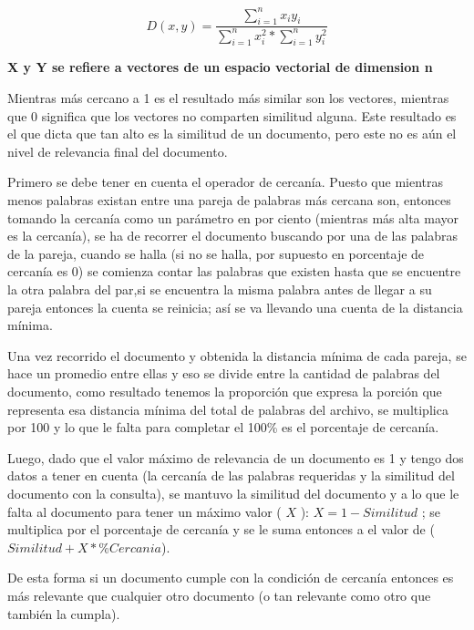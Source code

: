 \documentclass[10pt]{article}
\begin{document}
\huge \begin{equation*}
	D(x,y) = \frac{\sum_{i=1}^{n} x_{i} y_{i} }{ \sum_{i=1}^{n} x_{i}^2 * \sum_{i=1}^{n} y_{i}^2 }
\end{equation*} \normalsize

\begin{center}
	\bfseries  X y Y se refiere a vectores de un espacio vectorial de dimension n
\end{center}

Mientras más cercano a 1 es el resultado más similar son los vectores, mientras que 0 significa que los vectores no comparten similitud alguna. Este resultado es el que dicta que tan alto es la similitud de un documento, pero este no es aún el nivel de relevancia final del documento. 

Primero se debe tener en cuenta el operador de cercanía. Puesto que mientras menos palabras existan entre una pareja de palabras más cercana son, entonces tomando la cercanía como un parámetro en por ciento (mientras más alta mayor es la cercanía), se ha de recorrer el documento buscando por una de las palabras de la pareja, cuando se halla (si no se halla, por supuesto en porcentaje de cercanía es 0) se comienza contar las palabras que existen hasta que se encuentre la otra palabra del par,si se encuentra la misma palabra antes de llegar a su pareja entonces la cuenta se reinicia; así se va llevando una cuenta de la distancia mínima. 

Una vez recorrido el documento y obtenida la distancia mínima de cada pareja, se hace un promedio entre ellas y eso se divide entre la cantidad de palabras del documento, como resultado tenemos la proporción que expresa la porción que representa esa distancia mínima del total de palabras del archivo, se multiplica por 100 y lo que le falta para completar el 100\% es el porcentaje de cercanía.
 
Luego, dado que el valor máximo de relevancia de un documento es 1 y tengo dos datos a tener en cuenta (la cercanía de las palabras requeridas y la similitud del documento con la consulta), se mantuvo la similitud del documento y a lo que le falta al documento para tener un máximo valor ( $X$ ): \( X = 1 - Similitud \) ; se multiplica por el porcentaje de cercanía y se le suma entonces a el valor de  (\( Similitud + X * \%Cercania \)).

De esta forma si un documento cumple con la condición de cercanía entonces es más relevante que cualquier otro documento (o tan relevante como otro que también la cumpla).
\end{document}

